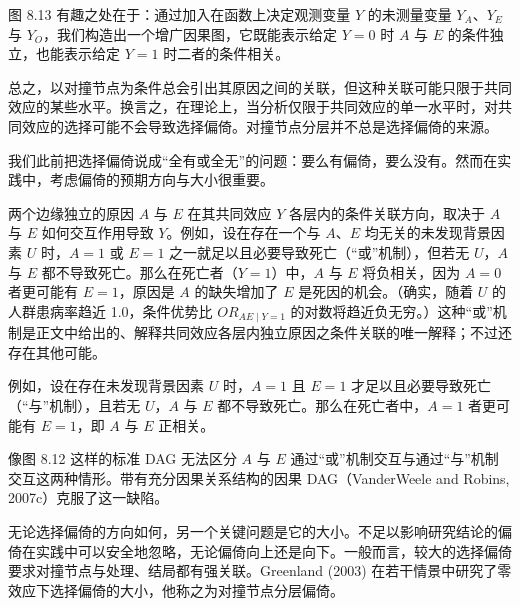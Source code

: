 图 8.13 有趣之处在于：通过加入在函数上决定观测变量 $Y$ 的未测量变量 $Y_A$、$Y_E$ 与 $Y_O$，我们构造出一个增广因果图，它既能表示给定 $Y=0$ 时 $A$ 与 $E$ 的条件独立，也能表示给定 $Y=1$ 时二者的条件相关。

总之，以对撞节点为条件总会引出其原因之间的关联，但这种关联可能只限于共同效应的某些水平。换言之，在理论上，当分析仅限于共同效应的单一水平时，对共同效应的选择可能不会导致选择偏倚。对撞节点分层并不总是选择偏倚的来源。

\begin{finepoint}[选择偏倚的强度与方向]
我们此前把选择偏倚说成“全有或全无”的问题：要么有偏倚，要么没有。然而在实践中，考虑偏倚的预期方向与大小很重要。

两个边缘独立的原因 $A$ 与 $E$ 在其共同效应 $Y$ 各层内的条件关联方向，取决于 $A$ 与 $E$ 如何交互作用导致 $Y$。例如，设在存在一个与 $A$、$E$ 均无关的未发现背景因素 $U$ 时，$A=1$ 或 $E=1$ 之一就足以且必要导致死亡（“或”机制），但若无 $U$，$A$ 与 $E$ 都不导致死亡。那么在死亡者（$Y=1$）中，$A$ 与 $E$ 将负相关，因为 $A=0$ 者更可能有 $E=1$，原因是 $A$ 的缺失增加了 $E$ 是死因的机会。（确实，随着 $U$ 的人群患病率趋近 1.0，条件优势比 $OR_{AE\mid Y=1}$ 的对数将趋近负无穷。）这种“或”机制是正文中给出的、解释共同效应各层内独立原因之条件关联的唯一解释；不过还存在其他可能。

例如，设在存在未发现背景因素 $U$ 时，$A=1$ 且 $E=1$ 才足以且必要导致死亡（“与”机制），且若无 $U$，$A$ 与 $E$ 都不导致死亡。那么在死亡者中，$A=1$ 者更可能有 $E=1$，即 $A$ 与 $E$ 正相关。

像图 8.12 这样的标准 DAG 无法区分 $A$ 与 $E$ 通过“或”机制交互与通过“与”机制交互这两种情形。带有充分因果关系结构的因果 DAG（VanderWeele and Robins, 2007c）克服了这一缺陷。

无论选择偏倚的方向如何，另一个关键问题是它的大小。不足以影响研究结论的偏倚在实践中可以安全地忽略，无论偏倚向上还是向下。一般而言，较大的选择偏倚要求对撞节点与处理、结局都有强关联。Greenland (2003) 在若干情景中研究了零效应下选择偏倚的大小，他称之为对撞节点分层偏倚。
\end{finepoint}

\renewcommand{\topfraction}{0.7}
\renewcommand{\bottomfraction}{0.3}
\renewcommand{\textfraction}{0.2}
\renewcommand{\floatpagefraction}{0.5}
\setcounter{topnumber}{2}
\setcounter{bottomnumber}{1}
\setcounter{totalnumber}{3}
